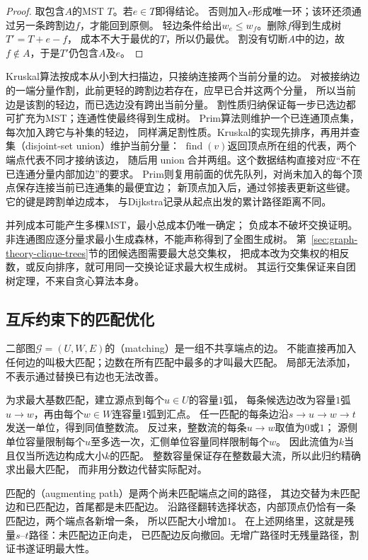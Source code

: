 \begin{proof}
取包含\(A\)的MST \(T\)。若\(e\in T\)即得结论。
否则加入\(e\)形成唯一环；该环还须通过另一条跨割边\(f\)，才能回到原侧。
轻边条件给出\(w_e\leq w_f\)。删除\(f\)得到生成树\(T'=T+e-f\)，
成本不大于最优的\(T\)，所以仍最优。
割没有切断\(A\)中的边，故\(f\notin A\)，于是\(T'\)仍包含\(A\)及\(e\)。
\end{proof}

Kruskal算法按成本从小到大扫描边，只接纳连接两个当前分量的边。
对被接纳边的一端分量作割，此前更轻的跨割边若存在，应早已合并这两个分量，
所以当前边是该割的轻边，而已选边没有跨出当前分量。
割性质归纳保证每一步已选边都可扩充为MST；连通性使最终得到生成树。
Prim算法则维护一个已连通顶点集，每次加入跨它与补集的轻边，
同样满足割性质。Kruskal的实现先排序，再用并查集（disjoint-set union）维护当前分量：
\(\operatorname{find}(v)\)返回顶点所在组的代表，两个端点代表不同才接纳该边，
随后用\(\operatorname{union}\)合并两组。这个数据结构直接对应“不在已连通分量内部加边”的要求。
Prim则复用前面的优先队列，对尚未加入的每个顶点保存连接当前已连通集的最便宜边；
新顶点加入后，通过邻接表更新这些键。它的键是跨割单边成本，
与Dijkstra记录从起点出发的累计路径距离不同。

并列成本可能产生多棵MST，最小总成本仍唯一确定；
负成本不破坏交换证明。非连通图应逐分量求最小生成森林，不能声称得到了全图生成树。
第~\ref{sec:graph-theory-clique-trees}节的团候选图需要最大总交集权，
把成本改为交集权的相反数，或反向排序，就可用同一交换论证求最大权生成树。
其运行交集保证来自团树定理，不来自贪心算法本身。

\subsection{互斥约束下的匹配优化}

二部图\(\mathcal G=(U,W,E)\)的（matching）是一组不共享端点的边。
不能直接再加入任何边的叫极大匹配；边数在所有匹配中最多的才叫最大匹配。
局部无法添加，不表示通过替换已有边也无法改善。

为求最大基数匹配，建立源点到每个\(u\in U\)的容量\(1\)弧，
每条候选边改为容量\(1\)弧\(u\to w\)，再由每个\(w\in W\)连容量\(1\)弧到汇点。
任一匹配的每条边沿\(s\to u\to w\to t\)发送一单位，得到同值整数流。
反过来，整数流的每条\(u\to w\)取值为\(0\)或\(1\)；
源侧单位容量限制每个\(u\)至多选一次，汇侧单位容量同样限制每个\(w\)。
因此流值为\(k\)当且仅当所选边构成大小\(k\)的匹配。
整数容量保证存在整数最大流，所以此归约精确求出最大匹配，
而非用分数边代替实际配对。

匹配的（augmenting path）是两个尚未匹配端点之间的路径，
其边交替为未匹配边和已匹配边，首尾都是未匹配边。
沿路径翻转选择状态，内部顶点仍恰有一条匹配边，两个端点各新增一条，
所以匹配大小增加\(1\)。
在上述网络里，这就是残量\(s\)--\(t\)路径：未匹配边正向走，
已匹配边反向撤回。无增广路径时无残量路径，割证书遂证明最大性。

